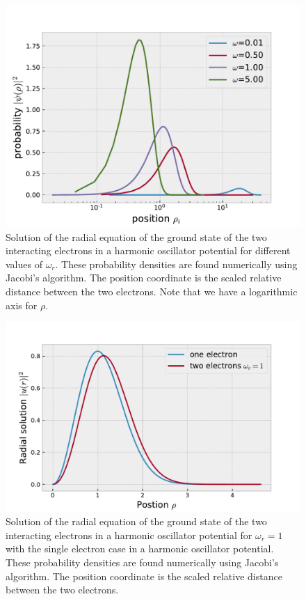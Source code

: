 \documentclass[%
 reprint,
nofootinbib,
aps,
]{revtex4-1}
\begin{document}
\begin{figure}
\centering
\includegraphics[scale=0.5]{../figures/wavefunc_many_omega.pdf}
\caption{Solution of the radial equation of the ground state of the two interacting electrons in a harmonic oscillator potential for different values of $\omega_r$. These  probability densities are found numerically using Jacobi's algorithm. The position coordinate is the scaled relative distance between the two electrons. Note that we have a logarithmic axis for $\rho$.}
\label{fig:many_omega}
\end{figure}



\begin{figure}
\centering
\includegraphics[scale=0.5]{../figures/difference_interaction.pdf}
\caption{Solution of the radial equation of the ground state of the two interacting electrons in a harmonic oscillator potential for $\omega_r=1$ with the single electron case in a harmonic oscillator potential. These  probability densities are found numerically using Jacobi's algorithm. The position coordinate is the scaled relative distance between the two electrons. }
\label{fig:compare}
\end{figure}
\end{document}
